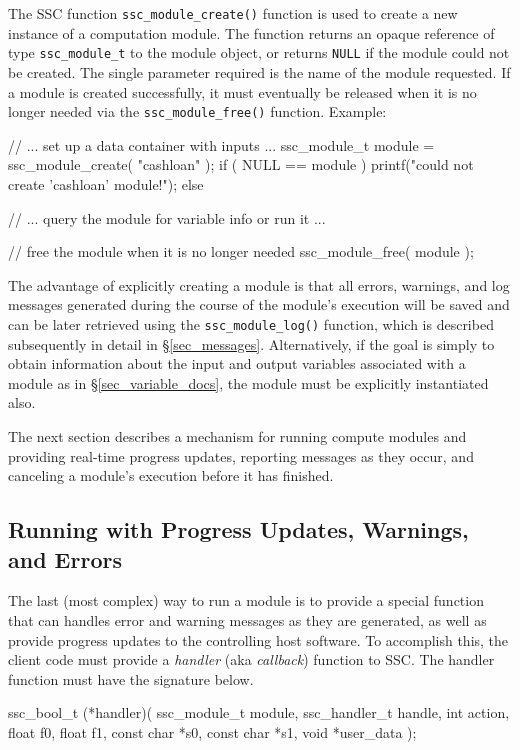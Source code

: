 \documentclass{scrartcl} %
\begin{document}
The SSC function \texttt{ssc\_module\_create()} function is used to create a new instance of a computation module.  The function returns an opaque reference of type \texttt{ssc\_module\_t} to the module object, or returns \texttt{NULL} if the module could not be created.  The single parameter required is the name of the module requested.  If a module is created successfully, it must eventually be released when it is no longer needed via the \texttt{ssc\_module\_free()} function.  Example:

\begin{verbatimtab}[4]
// ... set up a data container with inputs ...
ssc_module_t module = ssc_module_create( "cashloan" );
if ( NULL == module )
	printf("could not create 'cashloan' module!\n");
else
{
	// ... query the module for variable info or run it ...

	// free the module when it is no longer needed
	ssc_module_free( module );
}
\end{verbatimtab}

The advantage of explicitly creating a module is that all errors, warnings, and log messages generated during the course of the module's execution will be saved and can be later retrieved using the \texttt{ssc\_module\_log()} function, which is described subsequently in detail in \S\ref{sec_messages}.  Alternatively, if the goal is simply to obtain information about the input and output variables associated with a module as in \S\ref{sec_variable_docs}, the module must be explicitly instantiated also.

The next section describes a mechanism for running compute modules and providing real-time progress updates, reporting messages as they occur, and canceling a module's execution before it has finished.

\subsection{Running with Progress Updates, Warnings, and Errors}
\label{sec_errors}

The last (most complex) way to run a module is to provide a special function that can handles error and warning messages as they are generated, as well as provide progress updates to the controlling host software.  To accomplish this, the client code must provide a \emph{handler} (aka \emph{callback}) function to SSC.  The handler function must have the signature below.

\begin{verbatimtab}
ssc_bool_t (*handler)( ssc_module_t module, 
	ssc_handler_t handle, 
	int action, 
	float f0, 
	float f1, 
	const char *s0, 
	const char *s1, 
	void *user_data );
\end{verbatimtab}
\end{document}
